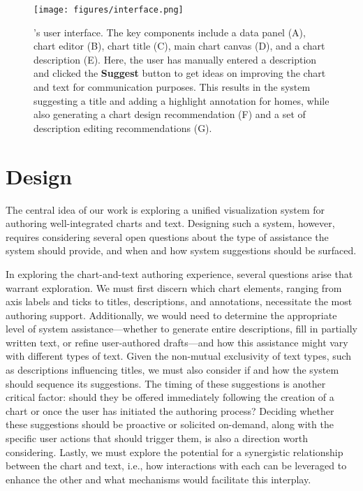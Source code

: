\begin{figure*}[t!]
    \centering
    \texttt{[image: figures/interface.png]}
    \caption{\pluto's user interface. The key components include a data panel (A), chart editor (B), chart title (C), main chart canvas (D), and a chart description (E).
    Here, the user has manually entered a description and clicked the {\small{}} \textbf{Suggest} button to get ideas on improving the chart and text for communication purposes.
    This results in the system suggesting a title and adding a highlight annotation for  homes, while also generating a chart design recommendation (F) and a set of description editing recommendations (G).}
    \label{fig:interface}
\end{figure*}

\section{Design}

The central idea of our work is exploring a unified visualization system for authoring well-integrated charts and text.
Designing such a system, however, requires considering several open questions about the type of assistance the system should provide, and when and how system suggestions should be surfaced.

In exploring the chart-and-text authoring experience, several questions arise that warrant exploration. We must first discern which chart elements, ranging from axis labels and ticks to titles, descriptions, and annotations, necessitate the most authoring support. Additionally, we would need to determine the appropriate level of system assistance—whether to generate entire descriptions, fill in partially written text, or refine user-authored drafts—and how this assistance might vary with different types of text. Given the non-mutual exclusivity of text types, such as descriptions influencing titles, we must also consider if and how the system should sequence its suggestions. The timing of these suggestions is another critical factor: should they be offered immediately following the creation of a chart or once the user has initiated the authoring process? Deciding whether these suggestions should be proactive or solicited on-demand, along with the specific user actions that should trigger them, is also a direction worth considering. Lastly, we must explore the potential for a synergistic relationship between the chart and text, i.e., how interactions with each can be leveraged to enhance the other and what mechanisms would facilitate this interplay.

